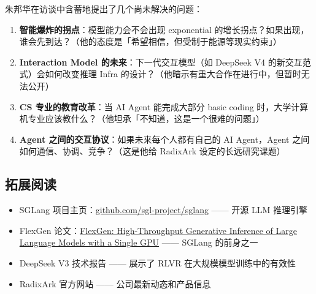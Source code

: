 \documentclass[a4paper]{article}
\begin{document}
朱邦华在访谈中含蓄地提出了几个尚未解决的问题：

\begin{enumerate}
\item \textbf{智能爆炸的拐点}：模型能力会不会出现 exponential 的增长拐点？如果出现，谁会先到达？（他的态度是「希望相信，但受制于能源等现实约束」）
\item \textbf{Interaction Model 的未来}：下一代交互模型（如 DeepSeek V4 的新交互范式）会如何改变推理 Infra 的设计？（他暗示有重大合作在进行中，但暂时无法公开）
\item \textbf{CS 专业的教育改革}：当 AI Agent 能完成大部分 basic coding 时，大学计算机专业应该教什么？（他坦承「不知道，这是一个很难的问题」）
\item \textbf{Agent 之间的交互协议}：如果未来每个人都有自己的 AI Agent，Agent 之间如何通信、协调、竞争？（这是他给 RadixArk 设定的长远研究课题）
\end{enumerate}

\subsection{拓展阅读}

\begin{itemize}
\item SGLang 项目主页：\href{https://github.com/sgl-project/sglang}{github.com/sgl-project/sglang} —— 开源 LLM 推理引擎
\item FlexGen 论文：\href{https://arxiv.org/abs/2303.06865}{FlexGen: High-Throughput Generative Inference of Large Language Models with a Single GPU} —— SGLang 的前身之一
\item DeepSeek V3 技术报告 —— 展示了 RLVR 在大规模模型训练中的有效性
\item RadixArk 官方网站 —— 公司最新动态和产品信息
\end{itemize}

\end{document}
